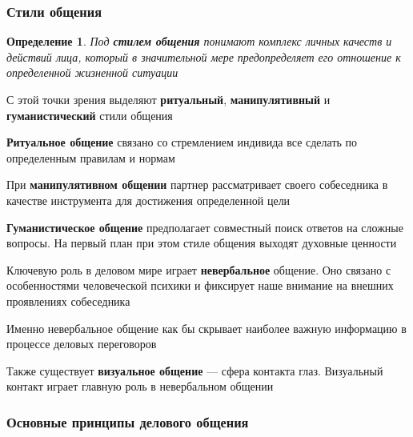 \documentclass{article}
\newtheorem{definition}{Определение}
\begin{document}
\subsubsection{Стили общения}

\begin{definition}
    Под \textbf{стилем общения} понимают комплекс личных качеств и действий лица, который в значительной мере предопределяет его отношение к определенной жизненной ситуации
\end{definition}

С этой точки зрения выделяют \textbf{ритуальный}, \textbf{манипулятивный} и \textbf{гуманистический} стили общения

\hfill

\textbf{Ритуальное общение} связано со стремлением индивида все сделать по определенным правилам и нормам

При \textbf{манипулятивном общении} партнер рассматривает своего собеседника в качестве инструмента для достижения определенной цели

\textbf{Гуманистическое общение} предполагает совместный поиск ответов на сложные вопросы. На первый план при этом стиле общения выходят духовные ценности

\hfill

Ключевую роль в деловом мире играет \textbf{невербальное} общение. Оно связано с особенностями человеческой психики и фиксирует наше внимание на внешних проявлениях собеседника

Именно невербальное общение как бы скрывает наиболее важную информацию в процессе деловых переговоров

Также существует \textbf{визуальное общение} — сфера контакта глаз. Визуальный контакт играет главную роль в невербальном общении

\subsubsection{Основные принципы делового общения}


\begin{multienumerate}
\end{multienumerate}
\end{document}
